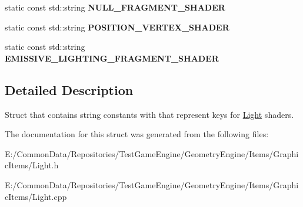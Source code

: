 \begin{DoxyCompactItemize}
\item 
\mbox{\label{struct_geometry_engine_1_1_geometry_world_item_1_1_geometry_light_1_1_light_shader_constants_af29588c31d1aaa409253d656bf6214ad}} 
static const std\+::string {\bfseries N\+U\+L\+L\+\_\+\+F\+R\+A\+G\+M\+E\+N\+T\+\_\+\+S\+H\+A\+D\+ER}
\item 
\mbox{\label{struct_geometry_engine_1_1_geometry_world_item_1_1_geometry_light_1_1_light_shader_constants_a4a7481727e093c9bde8a8e880f4b8274}} 
static const std\+::string {\bfseries P\+O\+S\+I\+T\+I\+O\+N\+\_\+\+V\+E\+R\+T\+E\+X\+\_\+\+S\+H\+A\+D\+ER}
\item 
\mbox{\label{struct_geometry_engine_1_1_geometry_world_item_1_1_geometry_light_1_1_light_shader_constants_a523b54c8367eb419f4866da79e220319}} 
static const std\+::string {\bfseries E\+M\+I\+S\+S\+I\+V\+E\+\_\+\+L\+I\+G\+H\+T\+I\+N\+G\+\_\+\+F\+R\+A\+G\+M\+E\+N\+T\+\_\+\+S\+H\+A\+D\+ER}
\end{DoxyCompactItemize}


\subsection{Detailed Description}
Struct that contains string constants with that represent keys for \mbox{\hyperlink{class_geometry_engine_1_1_geometry_world_item_1_1_geometry_light_1_1_light}{Light}} shaders. 

The documentation for this struct was generated from the following files\+:\begin{DoxyCompactItemize}
\item 
E\+:/\+Common\+Data/\+Repositories/\+Test\+Game\+Engine/\+Geometry\+Engine/\+Items/\+Graphic\+Items/Light.\+h\item 
E\+:/\+Common\+Data/\+Repositories/\+Test\+Game\+Engine/\+Geometry\+Engine/\+Items/\+Graphic\+Items/Light.\+cpp\end{DoxyCompactItemize}

